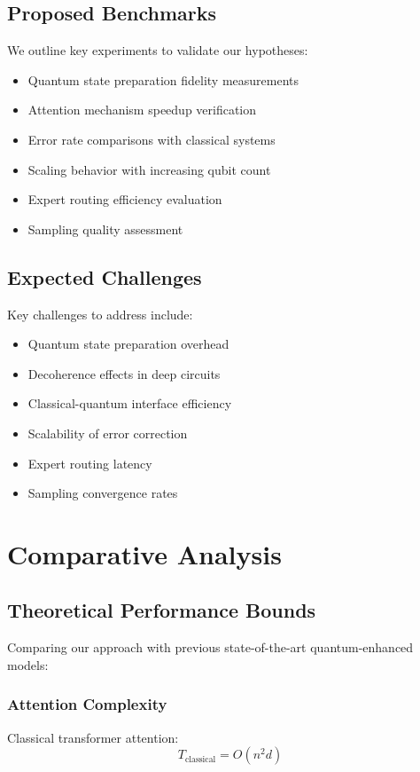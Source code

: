 \documentclass{article}
\begin{document}
\subsection{Proposed Benchmarks}
We outline key experiments to validate our hypotheses:

\begin{itemize}
\item Quantum state preparation fidelity measurements
\item Attention mechanism speedup verification
\item Error rate comparisons with classical systems
\item Scaling behavior with increasing qubit count
\item Expert routing efficiency evaluation
\item Sampling quality assessment
\end{itemize}

\subsection{Expected Challenges}
Key challenges to address include:

\begin{itemize}
\item Quantum state preparation overhead
\item Decoherence effects in deep circuits
\item Classical-quantum interface efficiency
\item Scalability of error correction
\item Expert routing latency
\item Sampling convergence rates
\end{itemize}

\section{Comparative Analysis}

\subsection{Theoretical Performance Bounds}
Comparing our approach with previous state-of-the-art quantum-enhanced models:

\subsubsection{Attention Complexity}
Classical transformer attention:
\begin{equation}
T_{\text{classical}} = O(n^2d)
\end{equation}
\end{document}
